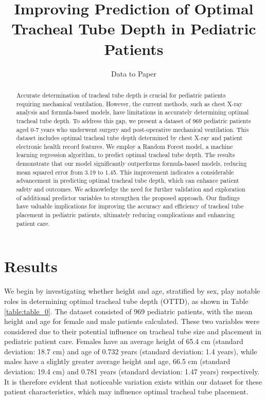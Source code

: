 \documentclass[11pt]{article}
\title{Improving Prediction of Optimal Tracheal Tube Depth in Pediatric Patients}
\author{Data to Paper}
\begin{document}
\maketitle
\begin{abstract}
Accurate determination of tracheal tube depth is crucial for pediatric patients requiring mechanical ventilation. However, the current methods, such as chest X-ray analysis and formula-based models, have limitations in accurately determining optimal tracheal tube depth. To address this gap, we present a dataset of 969 pediatric patients aged 0-7 years who underwent surgery and post-operative mechanical ventilation. This dataset includes optimal tracheal tube depth determined by chest X-ray and patient electronic health record features. We employ a Random Forest model, a machine learning regression algorithm, to predict optimal tracheal tube depth. The results demonstrate that our model significantly outperforms formula-based models, reducing mean squared error from 3.19 to 1.45. This improvement indicates a considerable advancement in predicting optimal tracheal tube depth, which can enhance patient safety and outcomes. We acknowledge the need for further validation and exploration of additional predictor variables to strengthen the proposed approach. Our findings have valuable implications for improving the accuracy and efficiency of tracheal tube placement in pediatric patients, ultimately reducing complications and enhancing patient care.
\end{abstract}
\section*{Results}

We begin by investigating whether height and age, stratified by sex, play notable roles in determining optimal tracheal tube depth (OTTD), as shown in Table {}\ref{table:table_0}. The dataset consisted of 969 pediatric patients, with the mean height and age for female and male patients calculated. These two variables were considered due to their potential influence on tracheal tube size and placement in pediatric patient care. Females have an average height of 65.4 cm (standard deviation: 18.7 cm) and age of 0.732 years (standard deviation: 1.4 years), while males have a slightly greater average height and age, 66.5 cm (standard deviation: 19.4 cm) and 0.781 years (standard deviation: 1.47 years) respectively. It is therefore evident that noticeable variation exists within our dataset for these patient characteristics, which may influence optimal tracheal tube placement.
\end{document}

